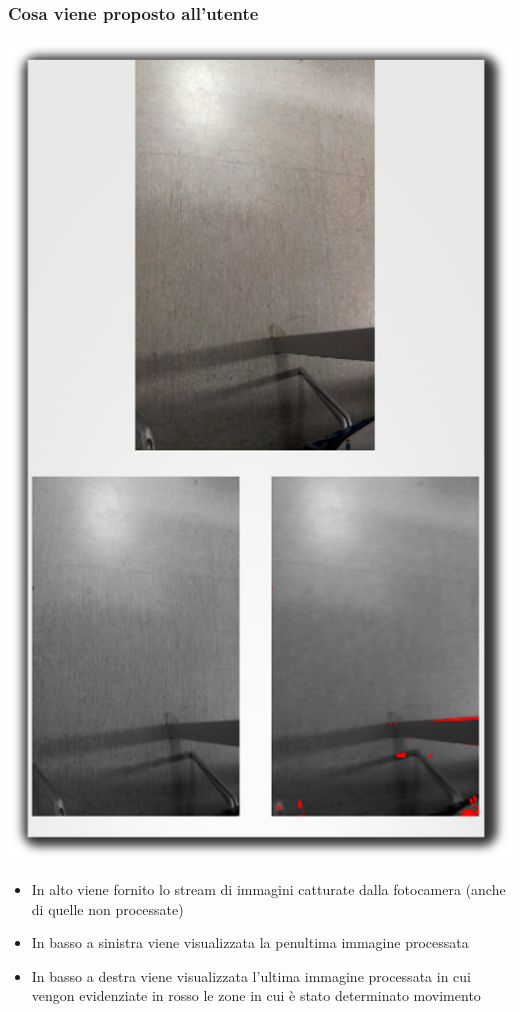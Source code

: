 \documentclass{beamer}
\begin{document}
\begin{frame}
\frametitle{Cosa viene proposto all'utente}
\begin{minipage}[c]{.25\textwidth}
\includegraphics[scale=.18]{./img/camera.png}
\end{minipage}\begin{minipage}[c]{.65\textwidth}
\begin{itemize}
  \item In alto viene fornito lo stream di immagini catturate dalla fotocamera (anche di quelle non processate)
  \item In basso a sinistra viene visualizzata la penultima immagine processata
  \item In basso a destra viene visualizzata l'ultima immagine processata in cui vengon evidenziate in rosso le zone in cui è stato determinato movimento
\end{itemize}
\end{minipage}
\end{frame}
\end{document}
